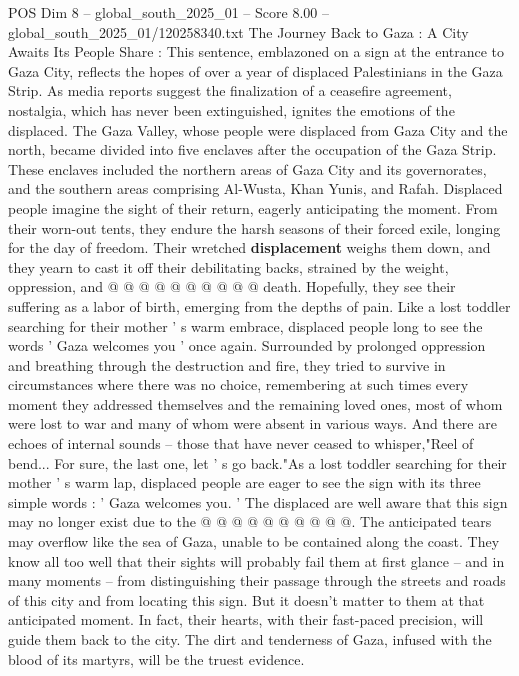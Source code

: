\begin{textsample}{POS Dim 8 – global\_south\_2025\_01 – Score 8.00 – global\_south\_2025\_01/120258340.txt}  \label{ex:f8_pos_117}
The Journey Back to Gaza : A City Awaits Its People Share : This sentence, emblazoned on a sign at the entrance to Gaza City, reflects the hopes of over a year of displaced Palestinians in the Gaza Strip.
As media reports suggest the finalization of a ceasefire agreement, nostalgia, which has never been extinguished, ignites the emotions of the displaced.
The Gaza Valley, whose people were displaced from Gaza City and the north, became divided into five enclaves after the occupation of the Gaza Strip.
These enclaves included the northern areas of Gaza City and its governorates, and the southern areas comprising Al-Wusta, Khan Yunis, and Rafah.
Displaced people imagine the sight of their return, eagerly anticipating the moment.
From their worn-out tents, they endure the harsh seasons of their forced exile, longing for the day of freedom.
Their wretched \textbf{displacement} weighs them down, and they yearn to cast it off their debilitating backs, strained by the weight, oppression, and @ @ @ @ @ @ @ @ @ @ death.
Hopefully, they see their suffering as a labor of birth, emerging from the depths of pain.
Like a lost toddler searching for their mother ' s warm embrace, displaced people long to see the words ' Gaza welcomes you ' once again.
Surrounded by prolonged oppression and breathing through the destruction and fire, they tried to survive in circumstances where there was no choice, remembering at such times every moment they addressed themselves and the remaining loved ones, most of whom were lost to war and many of whom were absent in various ways.
And there are echoes of internal sounds -- those that have never ceased to whisper,"Reel of bend...
For sure, the last one, let ' s go back."As a lost toddler searching for their mother ' s warm lap, displaced people are eager to see the sign with its three simple words : ' Gaza welcomes you. ' The displaced are well aware that this sign may no longer exist due to the @ @ @ @ @ @ @ @ @ @.
The anticipated tears may overflow like the sea of Gaza, unable to be contained along the coast.
They know all too well that their sights will probably fail them at first glance -- and in many moments -- from distinguishing their passage through the streets and roads of this city and from locating this sign.
But it doesn't matter to them at that anticipated moment.
In fact, their hearts, with their fast-paced precision, will guide them back to the city.
The dirt and tenderness of Gaza, infused with the blood of its martyrs, will be the truest evidence.

\end{textsample}
